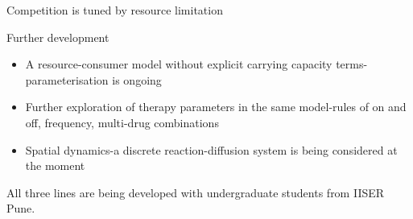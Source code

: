 \documentclass{beamer}
\begin{document}
\begin{frame}{Competition is tuned by resource limitation}
\end{frame}

\begin{frame}{Further development}
	\begin{itemize}
		\item A resource-consumer model without explicit carrying capacity terms-parameterisation is ongoing
		\item Further exploration of therapy parameters in the same model-rules of on and off, frequency, multi-drug combinations
		\item Spatial dynamics-a discrete reaction-diffusion system is being considered at the moment
	\end{itemize}
	All three lines are being developed with undergraduate students from IISER Pune.
\end{frame}
\end{document}
